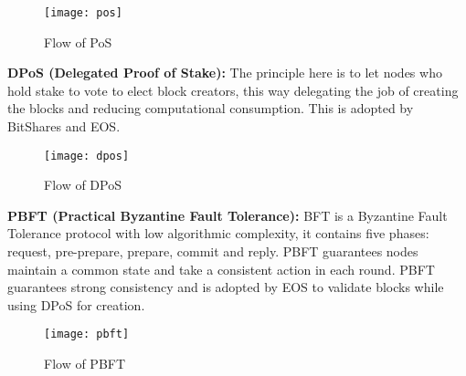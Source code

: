 \begin{figure}[h]
	\centering
	\texttt{[image: pos]}
	\caption{Flow of PoS}
	\label{fig:pos}
\end{figure}


\textbf{DPoS (Delegated Proof of Stake):} The principle here is to let nodes who
hold stake to vote to elect block creators, this way delegating the job of creating
the blocks and reducing computational consumption. This is adopted by BitShares and EOS.

\begin{figure}[h]
	\centering
	\texttt{[image: dpos]}
	\caption{Flow of DPoS}
	\label{fig:dpos}
\end{figure}

\textbf{PBFT (Practical Byzantine Fault Tolerance):} BFT is a Byzantine Fault 
Tolerance protocol with low algorithmic complexity, it contains five phases: request,
pre-prepare, prepare, commit and reply. PBFT guarantees nodes maintain a common state and take
a consistent action in each round. PBFT guarantees strong consistency and is adopted by
EOS to validate blocks while using DPoS for creation.

\begin{figure}[h]
	\centering
	\texttt{[image: pbft]}
	\caption{Flow of PBFT}
	\label{fig:pbft}
\end{figure}